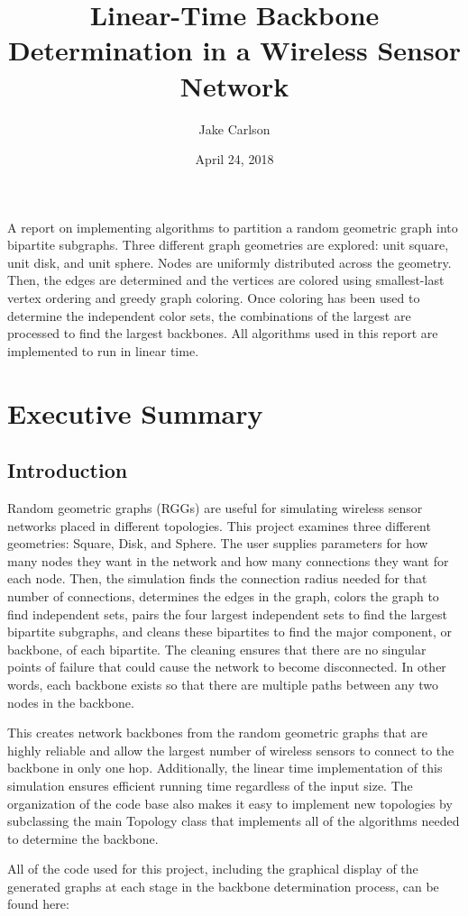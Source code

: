 \documentclass{article}
\begin{document}
\title{Linear-Time Backbone Determination in a Wireless Sensor Network}
\author{Jake Carlson}
\date{April 24, 2018}
\maketitle

\abstract
A report on implementing algorithms to partition a random geometric graph into bipartite subgraphs. Three different graph geometries are explored: unit square, unit disk, and unit sphere. Nodes are uniformly distributed across the geometry. Then, the edges are determined and the vertices are colored using smallest-last vertex ordering and greedy graph coloring. Once coloring has been used to determine the independent color sets, the combinations of the largest are processed to find the largest backbones. All algorithms used in this report are implemented to run in linear time.
\newpage

\tableofcontents
\lstlistoflistings
\newpage

\section{Executive Summary}

    \subsection{Introduction}
    Random geometric graphs (RGGs) are useful for simulating wireless sensor networks placed in different topologies. This project examines three different geometries: Square, Disk, and Sphere. The user supplies parameters for how many nodes they want in the network and how many connections they want for each node. Then, the simulation finds the connection radius needed for that number of connections, determines the edges in the graph, colors the graph to find independent sets, pairs the four largest independent sets to find the largest bipartite subgraphs, and cleans these bipartites to find the major component, or backbone, of each bipartite. The cleaning ensures that there are no singular points of failure that could cause the network to become disconnected. In other words, each backbone exists so that there are multiple paths between any two nodes in the backbone.
    \par
    This creates network backbones from the random geometric graphs that are highly reliable and allow the largest number of wireless sensors to connect to the backbone in only one hop. Additionally, the linear time implementation of this simulation ensures efficient running time regardless of the input size. The organization of the code base also makes it easy to implement new topologies by subclassing the main Topology class that implements all of the algorithms needed to determine the backbone.
    \par
    All of the code used for this project, including the graphical display of the generated graphs at each stage in the backbone determination process, can be found here:
\end{document}
